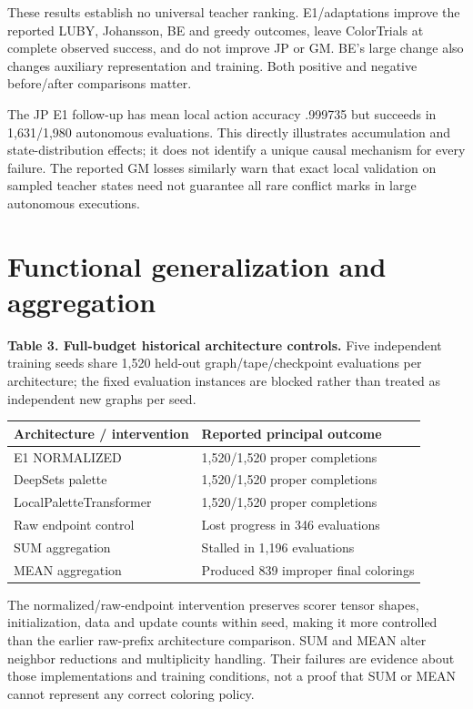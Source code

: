 \documentclass[
  11pt,
]{article}
\newcounter{none} %
\begin{document}
These results establish no universal teacher ranking. E1/adaptations
improve the reported LUBY, Johansson, BE and greedy outcomes, leave
ColorTrials at complete observed success, and do not improve JP or GM.
BE's large change also changes auxiliary representation and training.
Both positive and negative before/after comparisons matter.

The JP E1 follow-up has mean local action accuracy .999735 but succeeds
in 1,631/1,980 autonomous evaluations. This directly illustrates
accumulation and state-distribution effects; it does not identify a
unique causal mechanism for every failure. The reported GM losses
similarly warn that exact local validation on sampled teacher states
need not guarantee all rare conflict marks in large autonomous
executions.

\section{Functional generalization and
aggregation}\label{functional-generalization-and-aggregation}

\textbf{Table 3. Full-budget historical architecture controls.} Five
independent training seeds share 1,520 held-out graph/tape/checkpoint
evaluations per architecture; the fixed evaluation instances are blocked
rather than treated as independent new graphs per seed.

{\def\LTcaptype{none} %
\begin{longtable}[]{@{}ll@{}}
\toprule\noalign{}
Architecture / intervention & Reported principal outcome \\
\midrule\noalign{}
\endhead
\bottomrule\noalign{}
\endlastfoot
E1 NORMALIZED & 1,520/1,520 proper completions \\
DeepSets palette & 1,520/1,520 proper completions \\
LocalPaletteTransformer & 1,520/1,520 proper completions \\
Raw endpoint control & Lost progress in 346 evaluations \\
SUM aggregation & Stalled in 1,196 evaluations \\
MEAN aggregation & Produced 839 improper final colorings \\
\end{longtable}
}

The normalized/raw-endpoint intervention preserves scorer tensor shapes,
initialization, data and update counts within seed, making it more
controlled than the earlier raw-prefix architecture comparison. SUM and
MEAN alter neighbor reductions and multiplicity handling. Their failures
are evidence about those implementations and training conditions, not a
proof that SUM or MEAN cannot represent any correct coloring policy.
\end{document}
